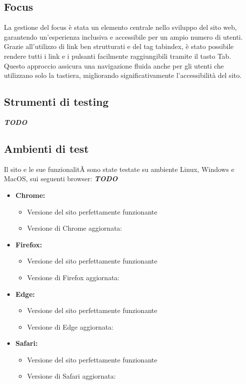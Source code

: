 \subsection{Focus}
La gestione del focus è stata un elemento centrale nello sviluppo del sito web, garantendo un’esperienza inclusiva e accessibile per un ampio numero di utenti. Grazie all’utilizzo di link ben strutturati e del tag tabindex, è stato possibile rendere tutti i link e i pulsanti facilmente raggiungibili tramite il tasto Tab. Questo approccio assicura una navigazione fluida anche per gli utenti che utilizzano solo la tastiera, migliorando significativamente l’accessibilità del sito.
\subsection{Strumenti di testing}
\textbf{\textit{TODO}}
\subsection{Ambienti di test}
Il sito e le sue funzionalitÃ sono state testate su ambiente Linux, Windows e MacOS, sui seguenti browser: \textbf{\textit{TODO}}
\begin{itemize}
    \item \textbf{Chrome:}
        \begin{itemize}
            \item Versione del sito perfettamente funzionante
            \item Versione di Chrome aggiornata: 
        \end{itemize}
    \item \textbf{Firefox:}
        \begin{itemize}
            \item Versione del sito perfettamente funzionante
            \item Versione di Firefox aggiornata: 
        \end{itemize}
    \item \textbf{Edge:}
        \begin{itemize}
            \item Versione del sito perfettamente funzionante
            \item Versione di Edge aggiornata: 
        \end{itemize}
    \item \textbf{Safari:}
        \begin{itemize}
            \item Versione del sito perfettamente funzionante
            \item Versione di Safari aggiornata: 
        \end{itemize}
\end{itemize}

